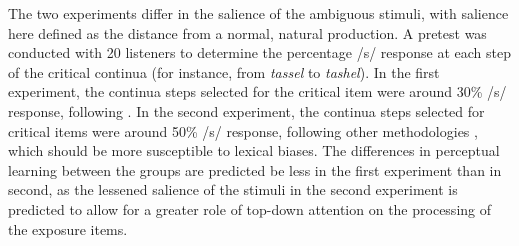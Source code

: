 \documentclass[11pt]{article} %
\begin{document}
The two experiments differ in the salience of the ambiguous stimuli, with salience here defined as the distance from a normal, natural production.  A pretest was conducted with 20 listeners to determine the percentage /s/ response at each step of the critical continua (for instance, from \emph{tassel} to \emph{tashel}).  In the first experiment, the continua steps selected for the critical item  were around 30\% /s/ response, following \citet{Reinisch2013}.  In the second experiment, the continua steps selected for critical items were around 50\% /s/ response, following other methodologies \citep{Norris2003,Kraljic2005}, which should be more susceptible to lexical biases.  The differences in perceptual learning between the groups are predicted be less in the first experiment than in second, as the lessened salience of the stimuli in the second experiment is predicted to allow for a greater role of top-down attention on the processing of the exposure items.



\end{document}
